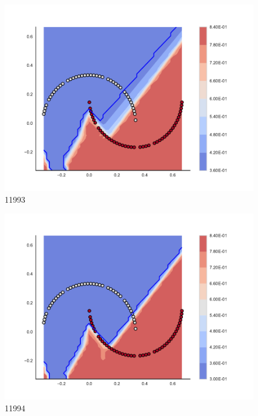\begin{subfigure}[b]{0.09\textwidth}
    \includegraphics[clip, trim=2.35cm 1.75cm 4.5cm 0cm,width=\textwidth]{img/convergence/11993.pdf}
    \caption{11993}
    \label{fig:convergence_11993}
\end{subfigure}
%
\begin{subfigure}[b]{0.09\textwidth}
    \includegraphics[clip, trim=2.35cm 1.75cm 4.5cm 0cm,width=\textwidth]{img/convergence/11994.pdf}
    \caption{11994}
    \label{fig:convergence_11994}
\end{subfigure}
%
